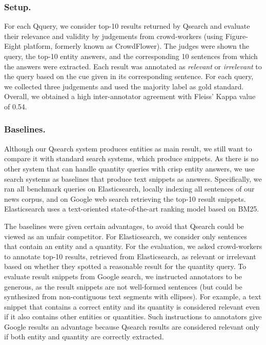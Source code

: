 \subsubsection{Setup.} 
For each Qquery, we consider top-10 results returned by Qsearch and evaluate 
their relevance and validity by judgements from crowd-workers (using Figure-Eight platform, formerly known as CrowdFlower).
The judges were shown the query, the top-10 entity answers, 
and the corresponding 10 sentences from which the answers were extracted. 
Each result was annotated  as \textit{relevant} or \textit{irrelevant} to the query based on the cue given in its corresponding sentence.
For each query, we collected three judgements and 
used the majority label as gold standard. Overall, we obtained a high inter-annotator agreement with Fleiss' Kappa value of 0.54.

\subsubsection{Baselines.} 
Although our Qsearch system produces entities as main result, we still want to compare it with standard search systems, which produce snippets. 
As there is no other system that can handle quantity queries with crisp entity answers, we use
search systems as baselines that produce text snippets as answers.
Specifically, we ran all benchmark queries on Elasticsearch, locally indexing all sentences of our news corpus,
and on Google web search retrieving the top-10 result snippets.
Elasticsearch uses a text-oriented state-of-the-art ranking model based on BM25.
%

The baselines were given certain advantages, to avoid that Qsearch could be viewed as an unfair competitor.
For Elasticsearch, we consider only sentences that contain an entity and a quantity. For the evaluation, we asked crowd-workers to annotate top-10 results, retrieved from Elasticsearch, as relevant or irrelevant based on whether they spotted a reasonable result for the quantity query.
To evaluate result snippets from Google search, we instructed annotators to be generous, as the result snippets are not well-formed sentences (but could be synthesized from
non-contiguous text segments with ellipses). For example, a text snippet that contains a correct entity and its quantity is considered relevant even if it also contains other entities or quantities. Such instructions to annotators give Google results an advantage because Qsearch results are considered relevant only if both entity and quantity are correctly extracted.


